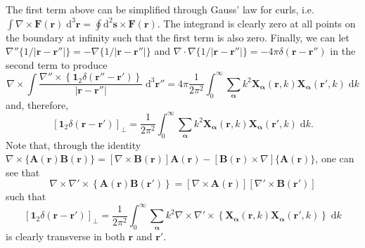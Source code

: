 \documentclass{article}
\numberwithin{equation}{section}
\begin{document}
The first term above can be simplified through Gauss' law for curls, i.e. $\int\nabla\times\mathbf{F}(\mathbf{r})\;\mathrm{d}^3\mathbf{r} = \oint\mathrm{d}^2\mathbf{s}\times\mathbf{F}(\mathbf{r})$. The integrand is clearly zero at all points on the boundary at infinity such that the first term is also zero. Finally, we can let $\nabla''\{1/|\mathbf{r} - \mathbf{r}''|\} = -\nabla\{1/|\mathbf{r} - \mathbf{r}''|\}$ and $\nabla\cdot\nabla\{1/|\mathbf{r} - \mathbf{r}''|\} = -4\pi\delta(\mathbf{r} - \mathbf{r}'')$ in the second term to produce
\begin{equation}
\nabla\times\int\frac{\nabla''\times\left\{\bm{1}_2\delta(\mathbf{r}'' - \mathbf{r}')\right\}}{|\mathbf{r} - \mathbf{r}''|}\;\mathrm{d}^3\mathbf{r}'' = 4\pi\frac{1}{2\pi^2}\int_0^\infty\sum_{\bm{\alpha}}k^2\mathbf{X}_{\bm{\alpha}}(\mathbf{r},k)\mathbf{X}_{\bm{\alpha}}(\mathbf{r}',k)\;\mathrm{d}k
\end{equation}
and, therefore,
\begin{equation}
\left[\bm{1}_2\delta(\mathbf{r} - \mathbf{r}')\right]_\perp = \frac{1}{2\pi^2}\int_0^\infty\sum_{\bm{\alpha}}k^2\mathbf{X}_{\bm{\alpha}}(\mathbf{r},k)\mathbf{X}_{\bm{\alpha}}(\mathbf{r}',k)\;\mathrm{d}k.
\end{equation}
Note that, through the identity $\nabla\times\{\mathbf{A}(\mathbf{r})\mathbf{B}(\mathbf{r})\} = [\nabla\times\mathbf{B}(\mathbf{r})]\mathbf{A}(\mathbf{r}) - [\mathbf{B}(\mathbf{r})\times\nabla]\{\mathbf{A}(\mathbf{r})\}$, one can see that
\begin{equation}
\nabla\times\nabla'\times\left\{\mathbf{A}(\mathbf{r})\mathbf{B}(\mathbf{r}')\right\} = [\nabla\times\mathbf{A}(\mathbf{r})][\nabla'\times\mathbf{B}(\mathbf{r}')]
\end{equation}
such that 
\begin{equation}
\left[\bm{1}_2\delta(\mathbf{r} - \mathbf{r}')\right]_\perp = \frac{1}{2\pi^2}\int_0^\infty\sum_{\bm{\alpha}}k^2\nabla\times\nabla'\times\left\{\mathbf{X}_{\bm{\alpha}}(\mathbf{r},k)\mathbf{X}_{\bm{\alpha}}(\mathbf{r}',k)\right\}\;\mathrm{d}k
\end{equation}
is clearly transverse in both $\mathbf{r}$ and $\mathbf{r}'$.
\end{document}
